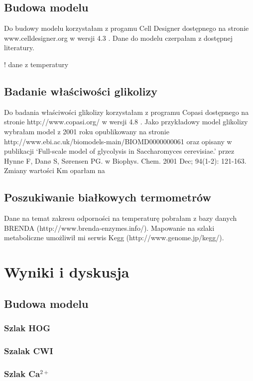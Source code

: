 \documentclass{pracamgr}
\begin{document}
\section{Budowa modelu}

Do budowy modelu korzystałam z progamu Cell Designer dostępnego na stronie www.celldesigner.org w wersji 4.3 . Dane do
modelu czerpałam z dostępnej literatury.

! dane z temperatury 

\section{Badanie właściwości glikolizy}

Do badania właściwości glikolizy korzystałam z programu Copasi dostępnego na stronie  http://www.copasi.org/ w wersji 4.8 .
Jako przykładowy model glikolizy wybrałam model z 2001 roku opublikowany na stronie http://www.ebi.ac.uk/biomodels-main/BIOMD0000000061
oraz opisany w publikacji `Full-scale model of glycolysis in Saccharomyces cerevisiae.' przez Hynne F, Danø S, Sørensen PG. w Biophys. Chem. 2001 Dec; 94(1-2): 121-163.
Zmiany wartości Km oparłam na %

\section{Poszukiwanie białkowych termometrów}

Dane na temat zakresu odporności na temperaturę pobrałam z bazy danych BRENDA (http://www.brenda-enzymes.info/). Mapowanie na szlaki
metaboliczne umożliwił mi serwis Kegg (http://www.genome.jp/kegg/).


\chapter{Wyniki i dyskusja}
\section{Budowa modelu}
\subsection{Szlak HOG}
\subsection{Szalak CWI}
\subsection{Szlak Ca$^{2+}$}
\end{document}
